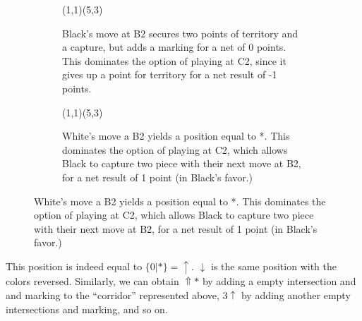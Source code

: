 \documentclass[../math194_paper.tex]{subfiles}
\begin{document}
\begin{figure}[H]
    \centering
    \begin{subfigure}[b]{0.45\linewidth}
    \centering
    \begin{psgopartialboard}{(1,1)(5,3)}
        
        
     \end{psgopartialboard}
    \caption{Black's move at B2 secures two points of territory and a capture, but adds a marking
    for a net of 0 points. This dominates the option of playing at C2, since it gives up a point
    for territory for a net result of -1 points.}
    \end{subfigure}
    \quad
    \begin{subfigure}[b]{0.45\linewidth}
    \centering
    \begin{psgopartialboard}{(1,1)(5,3)}
        
     \end{psgopartialboard}
    \caption{White's move a B2 yields a position equal to *. This dominates the option of playing 
    at C2, which allows Black to capture two piece with their next move at B2, for a net result 
    of 1 point (in Black's favor.)}
    \end{subfigure}
\end{figure}
This position is indeed equal to $\{0 | *\} = \uparrow$. $\downarrow$ is the same position with the colors reversed.
Similarly, we can obtain $\Uparrow*$ by adding a empty intersection and and marking to the ``corridor'' represented 
above, $3\uparrow$ by adding another empty intersections and marking, and so on.
\end{document}
